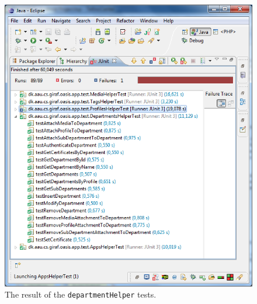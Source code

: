 \begin{figure}[htbp]
	\centering
		\includegraphics[width=\textwidth]{Images/unit_testing/department_helper_tests.PNG}
	\caption{The result of the \texttt{departmentHelper} tests.}
	\label{fig:department_helper_tests}
\end{figure}


